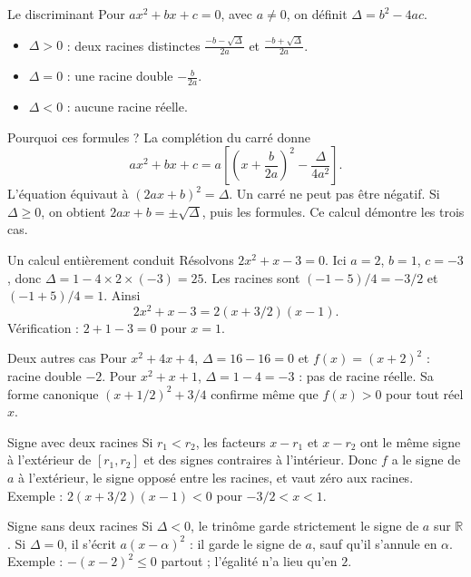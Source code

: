 \documentclass[aspectratio=169,12pt]{beamer}
\begin{document}
\renewcommand{\slidekind}{COMPRENDRE}
\begin{frame}[t,fragile]{Le discriminant}
Pour $ax^2+bx+c=0$, avec $a\ne0$, on définit $\Delta=b^2-4ac$. \begin{itemize}\item $\Delta>0$ : deux racines distinctes $\frac{-b-\sqrt\Delta}{2a}$ et $\frac{-b+\sqrt\Delta}{2a}$.\item $\Delta=0$ : une racine double $-\frac b{2a}$.\item $\Delta<0$ : aucune racine réelle.\end{itemize}
\end{frame}
\renewcommand{\slidekind}{JUSTIFIER}
\begin{frame}[t,fragile]{Pourquoi ces formules ?}
La complétion du carré donne \[ax^2+bx+c=a\left[\left(x+\frac b{2a}\right)^2-\frac{\Delta}{4a^2}\right].\] L’équation équivaut à $(2ax+b)^2=\Delta$. Un carré ne peut pas être négatif. Si $\Delta\ge0$, on obtient $2ax+b=\pm\sqrt\Delta$, puis les formules. Ce calcul démontre les trois cas.
\end{frame}
\renewcommand{\slidekind}{MÉTHODE \& EXEMPLE}
\begin{frame}[t,fragile]{Un calcul entièrement conduit}
Résolvons $2x^2+x-3=0$. Ici $a=2$, $b=1$, $c=-3$, donc $\Delta=1-4\times2\times(-3)=25$. Les racines sont $(-1-5)/4=-3/2$ et $(-1+5)/4=1$. Ainsi \[2x^2+x-3=2(x+3/2)(x-1).\] Vérification : $2+1-3=0$ pour $x=1$.
\end{frame}
\renewcommand{\slidekind}{COMPRENDRE}
\begin{frame}[t,fragile]{Deux autres cas}
Pour $x^2+4x+4$, $\Delta=16-16=0$ et $f(x)=(x+2)^2$ : racine double $-2$. Pour $x^2+x+1$, $\Delta=1-4=-3$ : pas de racine réelle. Sa forme canonique $(x+1/2)^2+3/4$ confirme même que $f(x)>0$ pour tout réel $x$.
\end{frame}
\renewcommand{\slidekind}{COMPRENDRE}
\begin{frame}[t,fragile]{Signe avec deux racines}
Si $r_1<r_2$, les facteurs $x-r_1$ et $x-r_2$ ont le même signe à l’extérieur de $[r_1,r_2]$ et des signes contraires à l’intérieur. Donc $f$ a le signe de $a$ à l’extérieur, le signe opposé entre les racines, et vaut zéro aux racines. Exemple : $2(x+3/2)(x-1)<0$ pour $-3/2<x<1$.
\end{frame}
\renewcommand{\slidekind}{COMPRENDRE}
\begin{frame}[t,fragile]{Signe sans deux racines}
Si $\Delta<0$, le trinôme garde strictement le signe de $a$ sur $\mathbb R$. Si $\Delta=0$, il s’écrit $a(x-\alpha)^2$ : il garde le signe de $a$, sauf qu’il s’annule en $\alpha$. Exemple : $-(x-2)^2\le0$ partout ; l’égalité n’a lieu qu’en $2$.
\end{frame}
\end{document}

